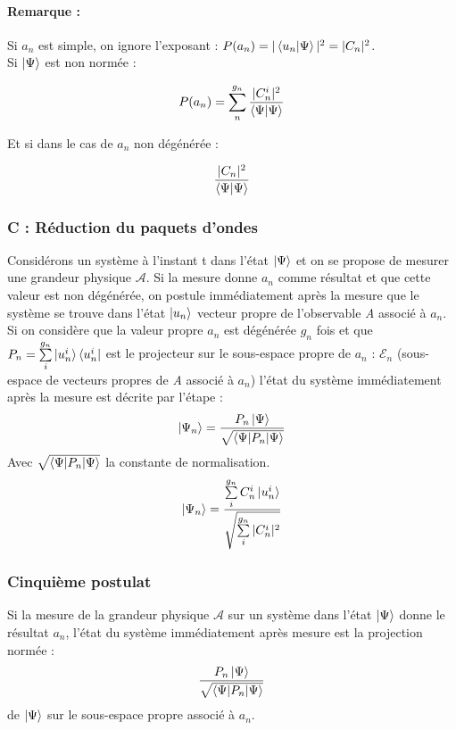 \documentclass[12pt,a4paper,titlepage]{book}
\begin{document}
\paragraph*{Remarque :}
Si $a_n$ est simple, on ignore l'exposant : $P(a_n) = \vert \braket{u_n | \Psi} \vert^2 = \vert C_n \vert^2$.\\

Si $\ket\Psi$ est non normée :

\begin{equation*}
P(a_n) = \sum\limits_n^{g_n} \frac{\vert C_n^i \vert^2}{\braket{\Psi \vert \Psi}}
\end{equation*}

Et si dans le cas de $a_n$ non dégénérée : 

\begin{equation*}
\frac{\vert C_n \vert^2}{\braket{\Psi \vert \Psi}}
\end{equation*}


\subsubsection{C : Réduction du paquets d'ondes}

Considérons un système à l'instant t dans l'état $\ket\Psi$ et on se propose de mesurer une grandeur physique $\mathcal{A}$. Si la mesure donne $a_n$ comme résultat et que cette valeur est non dégénérée, on postule immédiatement après la mesure que le système se trouve dans l'état $\ket{u_n}$ vecteur propre de l'observable \textit{A} associé à $a_n$.\\

Si on considère que la valeur propre $a_n$ est dégénérée $g_n$ fois et que $P_n = \sum\limits_i^{g_n} \ket{u_n^i} \bra{u_n^i}$ est le projecteur sur le sous-espace propre de $a_n$ : $\mathcal{E}_n$ (sous-espace de vecteurs propres de \textit{A} associé à $a_n$) l'état du système immédiatement après la mesure est décrite par l'étape :
\begin{equation*}
\ket{\Psi_n} = \frac{P_n \ket\Psi}{\sqrt{\braket{\Psi | P_n | \Psi}}}
\end{equation*}
Avec $\sqrt{\braket{\Psi | P_n | \Psi}}$ la constante de normalisation.
\begin{equation*}
\Ket{\Psi_n} = \frac{\sum\limits_i^{g_n} C_n^i \ket{u_n^i}}{\sqrt{\sum\limits_i^{g_n} \vert C_n^i \vert^2}}
\end{equation*}

\subsubsection{Cinquième postulat}
Si la mesure de la grandeur physique $\mathcal{A}$ sur un système dans l'état $\ket\Psi$ donne le résultat $a_n$, l'état du système immédiatement après mesure est la projection normée :
\begin{equation*}
\frac{P_n \ket\Psi}{\sqrt{\braket{\Psi | P_n | \Psi}}}
\end{equation*}
de $\ket\Psi$ sur le sous-espace propre associé à $a_n$.\\
\end{document}
